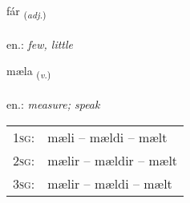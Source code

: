 \documentclass[frontgrid, backgrid]{flacards}\usepackage[]{graphicx}\usepackage[]{xcolor}
\begin{document}
\renewcommand{\blhead}{\vskip5pt {\small\bfseries\footnotesize Lýsingarorð | Adjective }}
\renewcommand{\bcfoot}{\vskip5pt \hspace{2pt}{\small\bfseries\footnotesize 1K}}


{fár \small{\textsubscript{(\textit{adj.})}} \\[1ex] %
\textphonetic{[fauːr]} \\
en.: \emph{few, little} \\  [2ex]
\renewcommand*{\arraystretch}{0.8}
}

\renewcommand{\flhead}{\vskip5pt \fboxsep=0pt {\small\bfseries\footnotesize Sagnorð | Verb}}
\renewcommand{\fcfoot}{\vskip5pt \fboxsep=0pt \hspace{2pt}{\small\bfseries\footnotesize 1K}}

\renewcommand{\blhead}{\vskip5pt {\small\bfseries\footnotesize Sagnorð | Verb }}
\renewcommand{\bcfoot}{\vskip5pt \hspace{2pt}{\small\bfseries\footnotesize 1K}}


{mæla \small{\textsubscript{(\textit{v.})}} \\[1ex] %
\textphonetic{[maiːla]} \\
en.: \emph{measure; speak} \\  [2ex]
\renewcommand*{\arraystretch}{0.8}
\begin{tabular}{p{1cm}l}
\textsc{1sg}: & mæli -- mældi -- mælt \\ 
\textsc{2sg}: & mælir -- mældir -- mælt \\ 
\textsc{3sg}: & mælir -- mældi -- mælt \\ 
\end{tabular}
}
\end{document}
